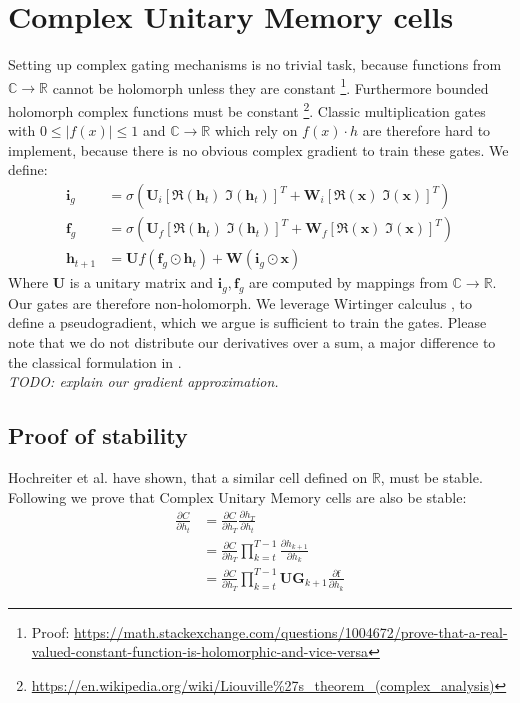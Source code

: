 \documentclass{article}
\begin{document}
\section{Complex Unitary Memory cells}
Setting up complex gating mechanisms is no trivial task, because functions from $\mathbb{C} \rightarrow \mathbb{R}$ cannot be holomorph unless they are constant \cite[page 9]{Bornemann}\footnote{Proof: \url{https://math.stackexchange.com/questions/1004672/prove-that-a-real-valued-constant-function-is-holomorphic-and-vice-versa}}. Furthermore bounded holomorph complex functions must be constant \cite[page 38]{Bornemann}\footnote{\url{https://en.wikipedia.org/wiki/Liouville\%27s\_theorem\_(complex\_analysis)}}.
Classic multiplication gates with $0 \leq |f(x)| \leq 1$ and $\mathbb{C} \rightarrow \mathbb{R}$ which rely on $f(x) \cdot h$ are therefore hard to implement, because there is no obvious complex gradient to train these gates. 
We define:
\begin{align}
\mathbf{i}_g &= \sigma(\mathbf{U}_i[\Re(\mathbf{h}_t) \; \Im(\mathbf{h}_t)]^T
                + \mathbf{W}_i[\Re(\mathbf{x}) \; \Im(\mathbf{x})]^T )\\
\mathbf{f}_g &= \sigma(\mathbf{U}_f[\Re(\mathbf{h}_t) \; \Im(\mathbf{h}_t)]^T
                + \mathbf{W}_f[\Re(\mathbf{x}) \; \Im(\mathbf{x})]^T )\\
\mathbf{h}_{t+1} &= \mathbf{U}f(\mathbf{f}_g \odot \mathbf{h}_t) + \mathbf{W}(\mathbf{i}_g \odot \mathbf{x})
\end{align}
Where $\mathbf{U}$ is a unitary matrix and $\mathbf{i}_g, \mathbf{f}_g$ are computed by mappings from $\mathbb{C} \rightarrow \mathbb{R}$. Our gates are therefore non-holomorph. We leverage Wirtinger calculus \cite{Franken}\cite{Delgado}\cite{Wirtinger}, to define a pseudogradient, which we argue is sufficient to train the gates. Please note that we do not distribute our derivatives over a sum, a major difference to the classical formulation in \cite{Hochreiter}. \\ 
\textit{TODO: explain our gradient approximation.}

\subsection{Proof of stability}
Hochreiter et al. \cite{Hochreiter} have shown, that a similar cell defined on $\mathbb{R}$, must be stable. Following \cite{Arjovsky} we prove that Complex Unitary Memory cells are also be stable:
\begin{align}
\frac{\partial C}{\partial h_{t}} &= \frac{\partial C}{\partial h_T}\frac{\partial h_T}{\partial h_t} \\
                                  &= \frac{\partial C}{\partial h_T}\prod_{k=t}^{T-1}\frac{\partial h_{k+1}}{\partial h_k} \\
                                  &= \frac{\partial C}{\partial h_T}\prod_{k=t}^{T-1}\mathbf{U}
                                  \mathbf{G}_{k+1} \frac{\partial \text{f}}{\partial h_k}
\end{align}
\end{document}
